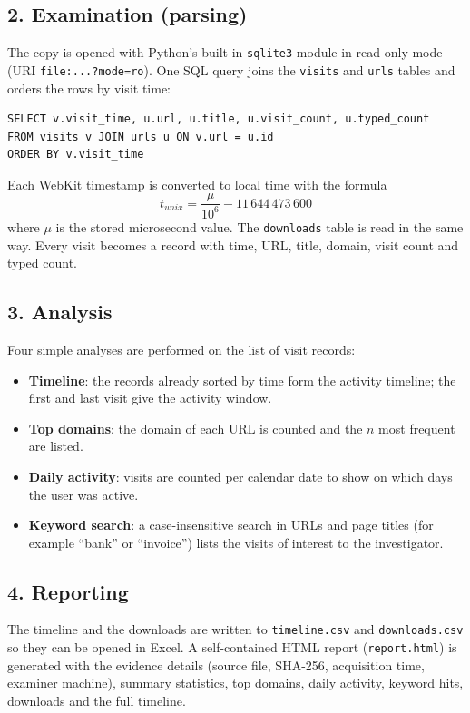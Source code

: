 \documentclass[12pt,a4paper]{article}
\begin{document}
\subsection*{2. Examination (parsing)}
The copy is opened with Python's built-in \texttt{sqlite3} module in read-only mode (URI \texttt{file:...?mode=ro}). One SQL query joins the \texttt{visits} and \texttt{urls} tables and orders the rows by visit time:
\begin{lstlisting}
SELECT v.visit_time, u.url, u.title, u.visit_count, u.typed_count
FROM visits v JOIN urls u ON v.url = u.id
ORDER BY v.visit_time
\end{lstlisting}
Each WebKit timestamp is converted to local time with the formula
\[ t_{unix} = \frac{\mu}{10^{6}} - 11\,644\,473\,600 \]
where $\mu$ is the stored microsecond value. The \texttt{downloads} table is read in the same way. Every visit becomes a record with time, URL, title, domain, visit count and typed count.

\subsection*{3. Analysis}
Four simple analyses are performed on the list of visit records:
\begin{itemize}[nosep]
  \item \textbf{Timeline}: the records already sorted by time form the activity timeline; the first and last visit give the activity window.
  \item \textbf{Top domains}: the domain of each URL is counted and the $n$ most frequent are listed.
  \item \textbf{Daily activity}: visits are counted per calendar date to show on which days the user was active.
  \item \textbf{Keyword search}: a case-insensitive search in URLs and page titles (for example ``bank'' or ``invoice'') lists the visits of interest to the investigator.
\end{itemize}

\subsection*{4. Reporting}
The timeline and the downloads are written to \texttt{timeline.csv} and \texttt{downloads.csv} so they can be opened in Excel. A self-contained HTML report (\texttt{report.html}) is generated with the evidence details (source file, SHA-256, acquisition time, examiner machine), summary statistics, top domains, daily activity, keyword hits, downloads and the full timeline.
\end{document}
